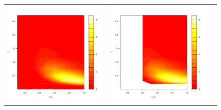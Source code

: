 \documentclass[10pt]{article}
\begin{document}
\begin{enumerate}
\begin{figure}
  \centering
  \begin{tabular}{ccc}
    \begin{minipage}{0.33\textwidth}
      \centering
      \includegraphics[width=1\linewidth]{small-t-analytic.pdf}
    \end{minipage}
    & \begin{minipage}{0.33\textwidth}
      \centering
      \includegraphics[width=1\linewidth]{small-t-Galerkin-no-filter.pdf}

\end{minipage}
\end{tabular}
\end{figure}
\end{enumerate}
\end{document}
